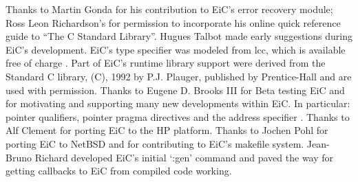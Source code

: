 Thanks to Martin Gonda for his contribution to EiC's error recovery
module; Ross Leon Richardson's for permission to incorporate his
online quick reference guide to ``The C Standard Library''. Hugues
Talbot made early suggestions during EiC's development. EiC's type
specifier was modeled from lcc, which is available free of charge
\cite{fraser-hanson95}. Part of EiC's runtime library
support were derived from the Standard C library, (C), 1992 by
P.J. Plauger, published by Prentice-Hall and are used with permission.
Thanks to Eugene D. Brooks III for Beta testing EiC and for motivating
and supporting many new developments within EiC. In particular:
pointer qualifiers, pointer pragma directives and the address
specifier . Thanks to Alf Clement for porting EiC to the HP
platform. Thanks to Jochen Pohl for porting EiC to NetBSD and for
contributing to EiC's makefile system. Jean-Bruno Richard developed
EiC's initial `:gen' command and paved the way for getting callbacks
to EiC from compiled code working.









